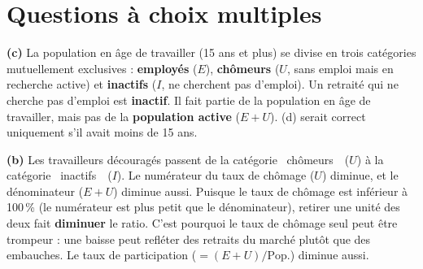 




\section{Questions à choix multiples}

\setcounter{qcmcounter}{0}



\begin{reponse}
\textbf{(c)} La population en âge de travailler (15 ans et plus) se divise en trois catégories mutuellement exclusives : \textbf{employés} ($E$), \textbf{chômeurs} ($U$, sans emploi mais en recherche active) et \textbf{inactifs} ($I$, ne cherchent pas d'emploi). Un retraité qui ne cherche pas d'emploi est \textbf{inactif}. Il fait partie de la population en âge de travailler, mais pas de la \textbf{population active} ($E + U$). (d) serait correct uniquement s'il avait moins de 15 ans.
\end{reponse}


\begin{reponse}
\textbf{(b)} Les travailleurs découragés passent de la catégorie \guillemotleft~chômeurs~\guillemotright\ ($U$) à la catégorie \guillemotleft~inactifs~\guillemotright\ ($I$). Le numérateur du taux de chômage ($U$) diminue, et le dénominateur ($E + U$) diminue aussi. Puisque le taux de chômage est inférieur à 100\,\% (le numérateur est plus petit que le dénominateur), retirer une unité des deux fait \textbf{diminuer} le ratio. C'est pourquoi le taux de chômage seul peut être trompeur : une baisse peut refléter des retraits du marché plutôt que des embauches. Le taux de participation ($= (E+U)/\text{Pop.}$) diminue aussi.
\end{reponse}

